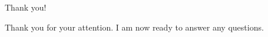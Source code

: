 \begin{frame}{Thank you!}
    
    \begin{center}
    Thank you for your attention. I am now ready to answer any questions.
    \end{center}
    
\end{frame}